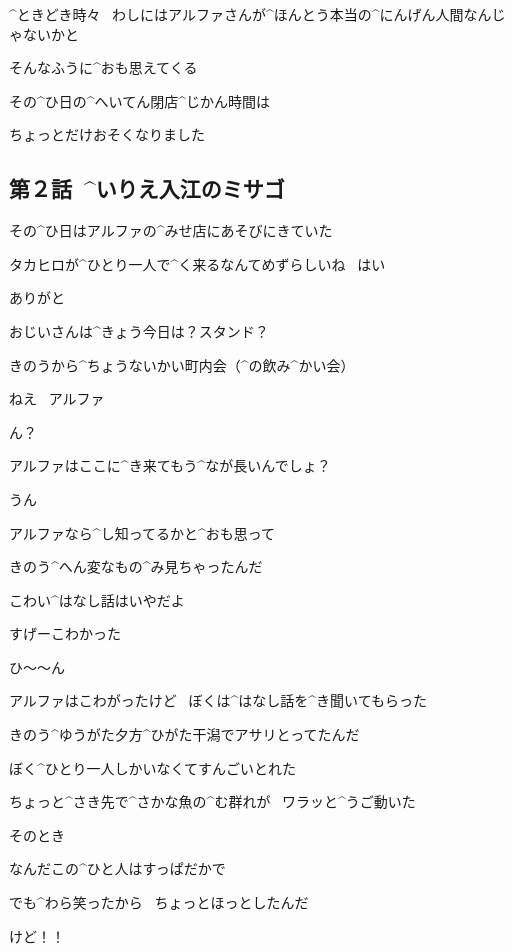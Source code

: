 \page
\Ojisan ^{ときどき}{時々}
\ わしにはアルファさんが^{ほんとう}{本当}の^{にんげん}{人間}なんじゃないかと

\Ojisan そんなふうに^{おも}{思}えてくる

\page[42]
\Alpha その^{ひ}{日}の^{へいてん}{閉店}^{じかん}{時間}は

\Alpha ちょっとだけおそくなりました


\subsection{第２話\ ^{いりえ}{入江}のミサゴ}

\page[44]
\Takahiro その^{ひ}{日}はアルファの^{みせ}{店}にあそびにきていた

\Alpha タカヒロが^{ひとり}{一人}で^{く}{来}るなんてめずらしいね
\ はい

\Takahiro ありがと

\Alpha おじいさんは^{きょう}{今日}は？スタンド？

\Takahiro きのうから^{ちょうないかい}{町内会}（^{の}{飲}み^{かい}{会}）

\Takahiro ねえ
\ アルファ

\Alpha ん？

\page
\Takahiro アルファはここに^{き}{来}てもう^{なが}{長}いんでしょ？

\Alpha うん

\Takahiro アルファなら^{し}{知}ってるかと^{おも}{思}って

\Takahiro きのう^{へん}{変}なもの^{み}{見}ちゃったんだ

\Alpha こわい^{はなし}{話}はいやだよ

\Takahiro すげーこわかった

\Alpha ひ〜〜ん

\Takahiro アルファはこわがったけど
\ ぼくは^{はなし}{話}を^{き}{聞}いてもらった

\page
\Takahiro きのう^{ゆうがた}{夕方}^{ひがた}{干潟}でアサリとってたんだ

\Takahiro ぼく^{ひとり}{一人}しかいなくてすんごいとれた

\Takahiro ちょっと^{さき}{先}で^{さかな}{魚}の^{む}{群}れが
\ ワラッと^{うご}{動}いた

\Takahiro そのとき

\page[49]
\Takahiro なんだこの^{ひと}{人}はすっぱだかで

\Takahiro でも^{わら}{笑}ったから
\ ちょっとほっとしたんだ

\Takahiro けど！！

